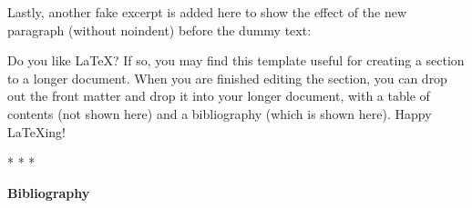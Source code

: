 \documentclass{article}
\begin{document}
\begin{spacing}{1.35}
Lastly, another fake excerpt is added here to show the effect of the new paragraph (without noindent) before the dummy text:

\begin{adjustwidth}{.65cm}{.5cm}
  \begin{singlespace}
Do you like LaTeX? If so, you may find this template useful for creating a section to a longer document. When you are finished editing the section, you can drop out the front matter and drop it into your longer document, with a table of contents (not shown here) and a bibliography (which is shown here). Happy LaTeXing!
\end{singlespace}
\end{adjustwidth}

\lipsum[1-1][]
  
  \begin{center}
  *\hspace{15pt} *\hspace{15pt} *
\end{center}

\lipsum[1-2][]

\clearpage

\begin{adjustwidth}{.65cm}{.5cm}
  \begin{center}
    \Large\textbf{Bibliography}
  \end{center}
\end{adjustwidth}
\vspace{-0.5cm}

\printbibliography[
  heading=subbibintoc,
  type=article,
  title={Articles},
  notkeyword=exclude
]

\printbibliography[
  heading=subbibintoc,
  type=book, 
  title={Books},
  notkeyword=exclude
]

\end{spacing}
\end{document}
